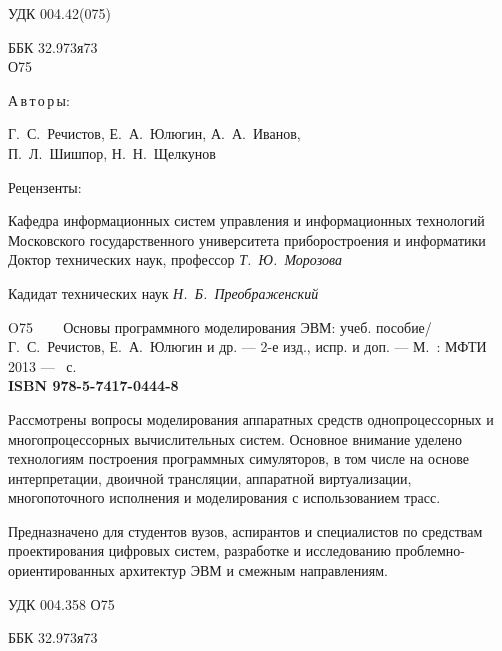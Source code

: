 \thispagestyle{empty}
\begingroup
\small
\begin{flushleft}
УДК 004.42(075)

ББК 32.973я73\\
\enskip \enskip \enskip \enskip \enskip О75    
\end{flushleft}
\begin{center}
\begin{normalsize}
\textsf{{А\,в\,т\,о\,р\,ы}:}
\end{normalsize}
Г.~С.~Речистов, Е.~А.~Юлюгин, А.~А.~Иванов, \\
П.~Л.~Шишпор, Н.~Н.~Щелкунов\\
\end {center}

\begin{center}
Рецензенты:

Кафедра информационных систем управления и информационных технологий Московского государственного университета приборостроения и информатики\\
Доктор технических наук, профессор \textit{Т.~Ю.~Морозова}

Кадидат технических наук \textit{Н.~Б.~Преображенский }

\end{center}

\noindent O75 ~~~ {Основы программного моделирования ЭВМ}: учеб. пособие/ \\Г.~С.~Речистов, Е.~А.~Юлюгин и др. --- 2-е изд., испр. и доп. --- М.~: МФТИ 2013 --- \pageref{page:lastpage}~с.\\
\textbf{ISBN 978-5-7417-0444-8}
\medskip

Рассмотрены вопросы моделирования аппаратных средств однопроцессорных и многопроцессорных вычислительных систем. Основное внимание уделено технологиям построения программных симуляторов, в том числе на основе интерпретации, двоичной трансляции, аппаратной виртуализации, многопоточного исполнения и моделирования с использованием трасс.

Предназначено для студентов вузов, аспирантов и специалистов по средствам проектирования цифровых систем, разработке и исследованию проблемно-ориентированных архитектур ЭВМ и смежным направлениям. 

{\raggedleft УДК 004.358 О75 \par}

{\raggedleft ББК 32.973я73 \par}
\vfill

